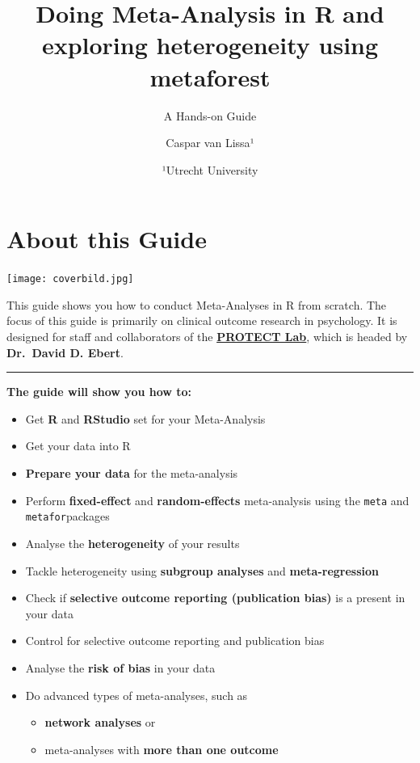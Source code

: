 \documentclass[]{book}
\title{Doing Meta-Analysis in R and exploring heterogeneity using metaforest}
\subtitle{A Hands-on Guide}
\author{Caspar van Lissa¹}
\date{¹Utrecht University}
\providecommand{\tightlist}{%
  \setlength{\itemsep}{0pt}\setlength{\parskip}{0pt}}
\begin{document}
\maketitle

{
\setcounter{tocdepth}{1}
\tableofcontents
}
\hypertarget{about-this-guide}{%
\chapter{About this Guide}\label{about-this-guide}}

\texttt{[image: coverbild.jpg]}

\begin{rmdinfo}
This guide shows you how to conduct Meta-Analyses in R from scratch. The
focus of this guide is primarily on clinical outcome research in
psychology. It is designed for staff and collaborators of the
\href{https://www.protectlab.org}{\textbf{PROTECT Lab}}, which is headed
by \textbf{Dr.~David D. Ebert}.
\end{rmdinfo}

\begin{center}\rule{0.5\linewidth}{\linethickness}\end{center}

\textbf{The guide will show you how to:}

\begin{itemize}
\tightlist
\item
  Get \textbf{R} and \textbf{RStudio} set for your Meta-Analysis
\item
  Get your data into R
\item
  \textbf{Prepare your data} for the meta-analysis
\item
  Perform \textbf{fixed-effect} and \textbf{random-effects} meta-analysis using the \texttt{meta} and \texttt{metafor}packages
\item
  Analyse the \textbf{heterogeneity} of your results
\item
  Tackle heterogeneity using \textbf{subgroup analyses} and \textbf{meta-regression}
\item
  Check if \textbf{selective outcome reporting (publication bias)} is a present in your data
\item
  Control for selective outcome reporting and publication bias
\item
  Analyse the \textbf{risk of bias} in your data
\item
  Do advanced types of meta-analyses, such as

  \begin{itemize}
  \tightlist
  \item
    \textbf{network analyses} or
  \item
    meta-analyses with \textbf{more than one outcome}
  \end{itemize}
\end{itemize}
\end{document}
